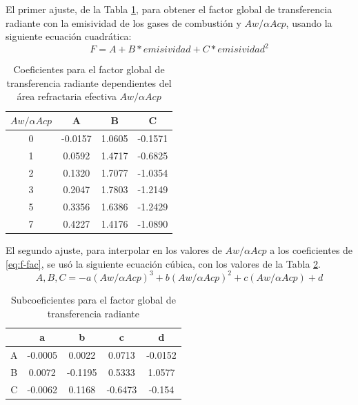 \par El primer ajuste, de la Tabla \ref{tbl:f-coef}, para obtener el factor global de transferencia radiante con la emisividad de los gases de combustión y $Aw/\alpha Acp$, usando la siguiente ecuación cuadrática:
\begin{equation}
\label{eq:f-fac}
F = A + B*emisividad + C*emisividad^2
\end{equation}
\begin{table}[H]
\caption{Coeficientes para el factor global de transferencia radiante dependientes del área refractaria efectiva $Aw/\alpha Acp$}
\label{tbl:f-coef}
\centering
\begin{tabular}{c|c|c|c}
$Aw/\alpha Acp$	&A	        & B	        &C      \\
\hline
0	    &-0.0157	& 1.0605	&-0.1571\\
1	    & 0.0592	& 1.4717	&-0.6825\\
2	    & 0.1320	& 1.7077	&-1.0354\\
3	    & 0.2047	& 1.7803	&-1.2149\\
5	    & 0.3356	& 1.6386	&-1.2429\\
7	    & 0.4227	& 1.4176	&-1.0890\\
\end{tabular}
\end{table}

\par El segundo ajuste, para interpolar en los valores de $Aw/\alpha Acp$ a los coeficientes de \ref{eq:f-fac}, se usó la siguiente ecuación cúbica, con los valores de la Tabla \ref{tbl:aw-fac}.
\begin{equation}
\label{eq:aw-fac}
A, B, C = -a(Aw/\alpha Acp)^3+b(Aw/\alpha Acp)^2+c(Aw/\alpha Acp)+d
\end{equation}
\begin{table}[H]
\caption{Subcoeficientes para el factor global de transferencia radiante}
\label{tbl:aw-fac}
\centering
\begin{tabular}{c|c|c|c|c}
    &	a	    & b         & c         &d      \\
    \hline
A	& -0.0005	& 0.0022	&0.0713	    &-0.0152\\
B	& 0.0072 	& -0.1195	&0.5333	    &1.0577 \\
C	& -0.0062   & 0.1168	&-0.6473	&-0.154 \\
\end{tabular}
\end{table}


